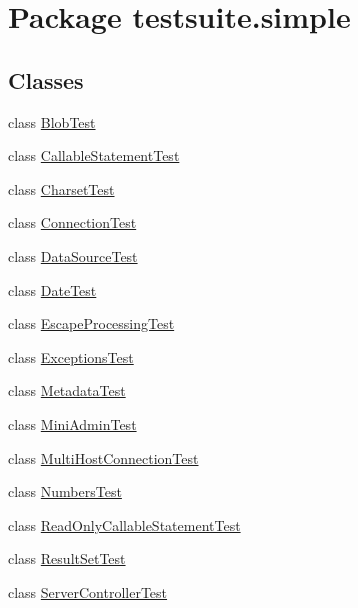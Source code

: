 \hypertarget{namespacetestsuite_1_1simple}{}\section{Package testsuite.\+simple}
\label{namespacetestsuite_1_1simple}
\subsection*{Classes}
\begin{DoxyCompactItemize}
\item 
class \mbox{\hyperlink{classtestsuite_1_1simple_1_1_blob_test}{Blob\+Test}}
\item 
class \mbox{\hyperlink{classtestsuite_1_1simple_1_1_callable_statement_test}{Callable\+Statement\+Test}}
\item 
class \mbox{\hyperlink{classtestsuite_1_1simple_1_1_charset_test}{Charset\+Test}}
\item 
class \mbox{\hyperlink{classtestsuite_1_1simple_1_1_connection_test}{Connection\+Test}}
\item 
class \mbox{\hyperlink{classtestsuite_1_1simple_1_1_data_source_test}{Data\+Source\+Test}}
\item 
class \mbox{\hyperlink{classtestsuite_1_1simple_1_1_date_test}{Date\+Test}}
\item 
class \mbox{\hyperlink{classtestsuite_1_1simple_1_1_escape_processing_test}{Escape\+Processing\+Test}}
\item 
class \mbox{\hyperlink{classtestsuite_1_1simple_1_1_exceptions_test}{Exceptions\+Test}}
\item 
class \mbox{\hyperlink{classtestsuite_1_1simple_1_1_metadata_test}{Metadata\+Test}}
\item 
class \mbox{\hyperlink{classtestsuite_1_1simple_1_1_mini_admin_test}{Mini\+Admin\+Test}}
\item 
class \mbox{\hyperlink{classtestsuite_1_1simple_1_1_multi_host_connection_test}{Multi\+Host\+Connection\+Test}}
\item 
class \mbox{\hyperlink{classtestsuite_1_1simple_1_1_numbers_test}{Numbers\+Test}}
\item 
class \mbox{\hyperlink{classtestsuite_1_1simple_1_1_read_only_callable_statement_test}{Read\+Only\+Callable\+Statement\+Test}}
\item 
class \mbox{\hyperlink{classtestsuite_1_1simple_1_1_result_set_test}{Result\+Set\+Test}}
\item 
class \mbox{\hyperlink{classtestsuite_1_1simple_1_1_server_controller_test}{Server\+Controller\+Test}}

\end{DoxyCompactItemize}
